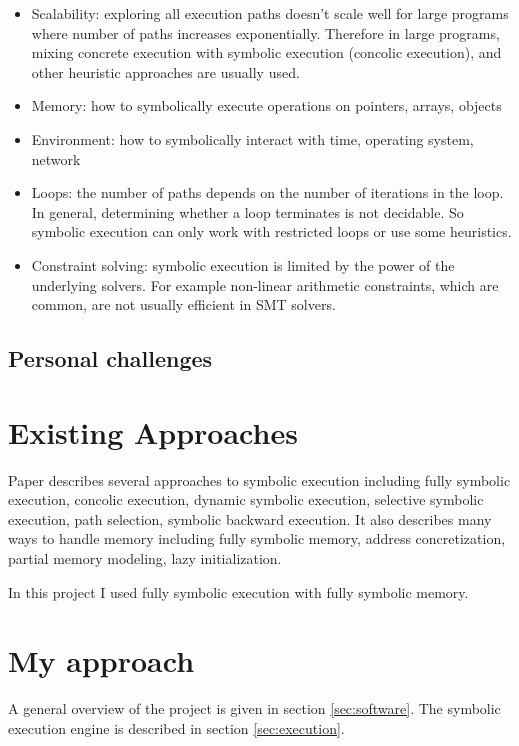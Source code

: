 \documentclass[12pt,a4paper]{article}
\begin{document}
\begin{itemize}
\item Scalability: exploring all execution paths doesn't scale well for large programs where number of paths increases exponentially. Therefore in large programs, mixing concrete execution with symbolic execution (concolic execution), and other heuristic approaches are usually used. 

\item Memory: how to symbolically execute operations on pointers, arrays, objects
\item Environment: how to symbolically interact with time, operating system, network
\item Loops: the number of paths depends on the number of iterations in the loop. In general, determining whether a loop terminates is not decidable. So symbolic execution can only work with restricted loops or use some heuristics. 
\item Constraint solving:  symbolic execution is limited by the power of the underlying solvers. For example non-linear arithmetic constraints, which are common, are not usually efficient in SMT solvers. 

\end{itemize}

\subsection{Personal challenges}

\section{Existing Approaches}

Paper \cite{paper} describes several approaches to symbolic execution including fully symbolic execution,  concolic execution, dynamic symbolic execution, selective symbolic execution, path selection, symbolic backward execution. It also describes many ways to handle memory including  fully symbolic memory, address concretization, partial memory modeling, lazy initialization. 

In this project I used fully symbolic execution with fully symbolic memory. 

\section{My approach}

A general overview of the project is given in section \ref{sec:software}. The symbolic execution engine is described in section \ref{sec:execution}.
\end{document}
